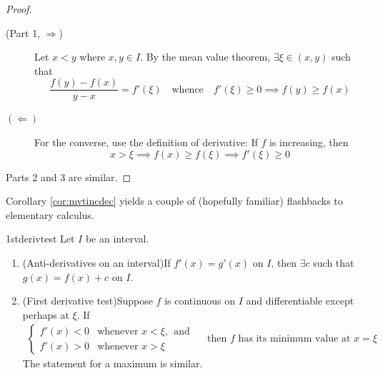 \goodbreak

\begin{proof}
	\begin{description}
		\item[\normalfont (Part 1, $\Rightarrow$)] Let $x<y$ where $x,y\in I$. By the mean value theorem, $\exists\xi\in(x,y)$ such that
		\[
			\frac{f(y)-f(x)}{y-x}=f'(\xi)
			\quad\text{whence}\quad 
			f'(\xi)\ge 0\implies f(y)\ge f(x)
		\]
		\item[$(\Leftarrow)$] For the converse, use the definition of derivative:  If $f$ is increasing, then
		\[
			x>\xi\implies f(x)\ge f(\xi)\implies f'(\xi)\ge 0
		\]
	\end{description}
	Parts 2 and 3 are similar.
\end{proof}

Corollary \ref{cor:mvtincdec} yields a couple of (hopefully familiar) flashbacks to elementary calculus.

\begin{cor}{}{1stderivtest}
	Let $I$ be an interval.
	\begin{enumerate}
	  \item (Anti-derivatives on an interval)\quad If $f'(x)=g'(x)$ on $I$, then $\exists c$ such that $g(x)=f(x)+c$ on $I$.
	  \item (First derivative test)\quad Suppose $f$ is continuous on $I$ and differentiable except perhaps at $\xi$. If
		\begin{gather*}
			\begin{cases}
			f'(x)<0&\text{whenever }x<\xi,\ \ \text{and}\\
			f'(x)>0&\text{whenever }x>\xi
			\end{cases}\quad \text{ then $f$ has its minimum value at $x=\xi$}
		\end{gather*}
		The statement for a maximum is similar.
	\end{enumerate}
\end{cor}


